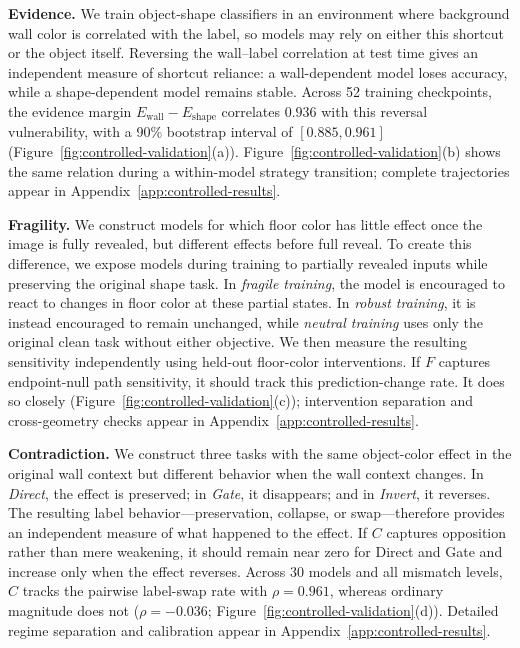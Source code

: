 \textbf{Evidence.}
We train object-shape classifiers in an environment where background wall color is correlated with the label, so models may rely on either this shortcut or the object itself. Reversing the wall--label correlation at test time gives an independent measure of shortcut reliance: a wall-dependent model loses accuracy, while a shape-dependent model remains stable. Across 52 training checkpoints, the evidence margin $E_{\mathrm{wall}}-E_{\mathrm{shape}}$ correlates $0.936$ with this reversal vulnerability, with a 90\% bootstrap interval of $[0.885,0.961]$ (Figure~\ref{fig:controlled-validation}(a)). Figure~\ref{fig:controlled-validation}(b) shows the same relation during a within-model strategy transition; complete trajectories appear in Appendix~\ref{app:controlled-results}.

\textbf{Fragility.}
We construct models for which floor color has little effect once the image is fully revealed, but different effects before full reveal. To create this difference, we expose models during training to partially revealed inputs while preserving the original shape task. In \emph{fragile training}, the model is encouraged to react to changes in floor color at these partial states. In \emph{robust training}, it is instead encouraged to remain unchanged, while \emph{neutral training} uses only the original clean task without either objective. We then measure the resulting sensitivity independently using held-out floor-color interventions. If $F$ captures endpoint-null path sensitivity, it should track this prediction-change rate. It does so closely (Figure~\ref{fig:controlled-validation}(c)); intervention separation and cross-geometry checks appear in Appendix~\ref{app:controlled-results}.

\textbf{Contradiction.}
We construct three tasks with the same object-color effect in the original wall context but different behavior when the wall context changes. In \emph{Direct}, the effect is preserved; in \emph{Gate}, it disappears; and in \emph{Invert}, it reverses. The resulting label behavior---preservation, collapse, or swap---therefore provides an independent measure of what happened to the effect. If $C$ captures opposition rather than mere weakening, it should remain near zero for Direct and Gate and increase only when the effect reverses. Across 30 models and all mismatch levels, $C$ tracks the pairwise label-swap rate with $\rho=0.961$, whereas ordinary magnitude does not ($\rho=-0.036$; Figure~\ref{fig:controlled-validation}(d)). Detailed regime separation and calibration appear in Appendix~\ref{app:controlled-results}.

